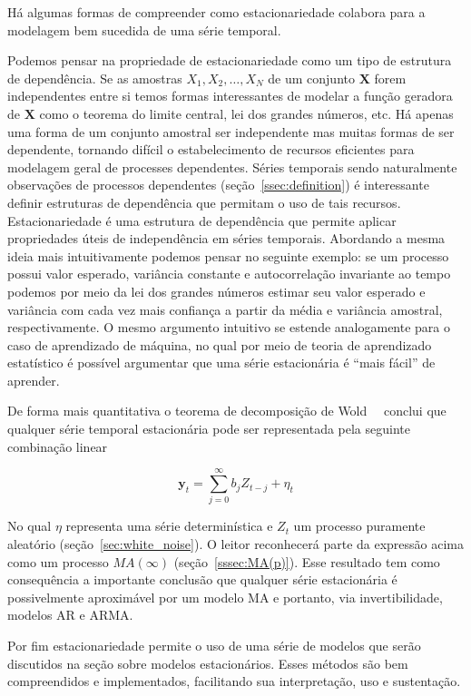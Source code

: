 Há algumas formas de compreender como estacionariedade colabora para a
modelagem bem sucedida de uma série temporal.

Podemos pensar na propriedade de estacionariedade como um tipo de estrutura de
dependência. Se as amostras $X_1, X_2, \dots, X_N$ de um conjunto $\mathbf{X}$
forem independentes entre si temos formas interessantes de modelar a função
geradora de $\mathbf{X}$ como o teorema do limite central, lei dos grandes
números, etc. Há apenas uma forma de um conjunto amostral ser independente mas
muitas formas de ser dependente, tornando difícil o estabelecimento de recursos
eficientes para modelagem geral de processes dependentes. Séries temporais
sendo naturalmente observações de processos dependentes
(seção~\ref{ssec:definition}) é interessante definir estruturas de dependência
que permitam o uso de tais recursos. Estacionariedade é uma estrutura de
dependência que permite aplicar propriedades úteis de independência em séries
temporais. Abordando a mesma ideia mais intuitivamente podemos pensar no
seguinte exemplo: se um processo possui valor esperado, variância constante e
autocorrelação invariante ao tempo podemos por meio da lei dos grandes números
estimar seu valor esperado e variância com cada vez mais confiança a partir da
média e variância amostral, respectivamente. O mesmo argumento intuitivo se
estende
analogamente para o caso de aprendizado de máquina, no qual por meio de teoria
de aprendizado estatístico é possível argumentar que uma série estacionária é
``mais fácil'' de aprender.

De forma mais quantitativa o teorema de decomposição de Wold~~\cite{chatfield}
conclui que qualquer série temporal estacionária pode ser representada pela
seguinte combinação linear

$$\mathbf{y}_t = \sum_{j=0}^\infty b_j Z_{t-j} + \eta_t$$

No qual $\eta$ representa uma série determinística e $Z_t$ um processo
puramente aleatório (seção~\ref{sec:white_noise}). O leitor reconhecerá parte
da expressão acima como um processo $MA(\infty)$ (seção~\ref{sssec:MA(p)}).
Esse resultado tem como consequência a importante conclusão que qualquer série
estacionária é possivelmente aproximável por um modelo MA e portanto, via
invertibilidade, modelos AR e ARMA.

Por fim estacionariedade permite o uso de uma série de modelos que serão
discutidos na seção sobre modelos estacionários. Esses métodos são bem
compreendidos e implementados, facilitando sua interpretação, uso e
sustentação.

